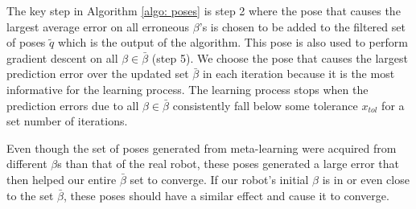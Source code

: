 \documentclass[letterpaper, 10 pt, conference]{ieeeconf}
\begin{document}
The key step in Algorithm \ref{algo: poses} is step 2 where the pose that causes
the largest average error on all erroneous $\beta$'s is chosen to be added to
the filtered set of poses $\widetilde{q}$ which is the output of the algorithm.
This pose is also used to perform gradient descent on all $\beta \in
\bar{\beta}$ (step 5). We choose the pose that causes the largest prediction
error over the updated set $\bar\beta$ in each iteration because it is the most
informative for the learning process. The learning process stops when the
prediction errors due to all $\beta \in \bar{\beta}$ consistently fall below
some tolerance $x_{tol}$ for a set number of iterations.



Even though the set of poses generated from meta-learning were acquired from
different $\beta$s than that of the real robot, these poses generated a large
error that then helped our entire $\bar{\beta}$ set to converge. If our robot's
initial $\beta$ is in or even close to the set $\bar{\beta}$, these poses should
have a similar effect and cause it to converge.




\end{document}
